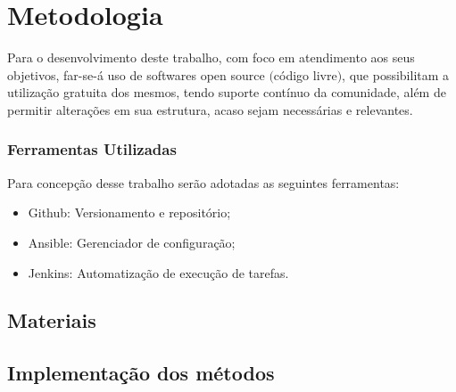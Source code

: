 



\chapter{Metodologia}\label{cap:metodologia}
Para o desenvolvimento deste trabalho, com foco em atendimento aos seus objetivos, far-se-á uso de softwares open source  $($código livre$)$, que possibilitam a utilização gratuita dos mesmos, tendo suporte contínuo da comunidade, além de permitir alterações em sua estrutura, acaso sejam necessárias e relevantes.




\subsection{Ferramentas Utilizadas}
Para concepção desse trabalho serão adotadas as seguintes ferramentas:

\begin{itemize}

\item Github: Versionamento e repositório;

\item Ansible: Gerenciador de configuração;

\item Jenkins: Automatização de execução de tarefas.
\end{itemize}


\section{Materiais}






\section{Implementação dos métodos}



